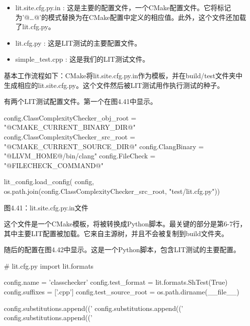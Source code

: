 \begin{itemize}
\item
lit.site.cfg.py.in : 这是主要的配置文件，一个CMake配置文件。它将标记为’@…@'的模式替换为在CMake配置中定义的相应值。此外，这个文件还加载了lit.cfg.py。

\item
lit.cfg.py : 这是LIT测试的主要配置文件。

\item
simple\_test.cpp : 这是我们的LIT测试文件。
\end{itemize}

基本工作流程如下：CMake将lit.site.cfg.py.in作为模板，并在build/test文件夹中生成相应的lit.site.cfg.py。这个文件然后被LIT测试用作执行测试的种子。


有两个LIT测试配置文件。第一个在图4.41中显示。

\begin{python}
config.ClassComplexityChecker_obj_root = "@CMAKE_CURRENT_BINARY_DIR@"
config.ClassComplexityChecker_src_root = "@CMAKE_CURRENT_SOURCE_DIR@"
config.ClangBinary = "@LLVM_HOME@/bin/clang"
config.FileCheck = "@FILECHECK_COMMAND@"

lit_config.load_config(
  config, os.path.join(config.ClassComplexityChecker_src_root, "test/lit.cfg.py"))
\end{python}

\begin{center}
图4.41：lit.site.cfg.py.in文件
\end{center}

这个文件是一个CMake模板，将被转换成Python脚本。最关键的部分是第6-7行，其中主要LIT配置被加载。它来自主源树，并且不会被复制到build文件夹。

随后的配置在图4.42中显示。这是一个Python脚本，包含LIT测试的主要配置。

\begin{python}
# lit.cfg.py
import lit.formats

config.name = 'classchecker'
config.test_format = lit.formats.ShTest(True)
config.suffixes = ['.cpp']
config.test_source_root = os.path.dirname(__file__)

config.substitutions.append(('%
config.substitutions.append(('%
config.substitutions.append(('%
\end{python}


